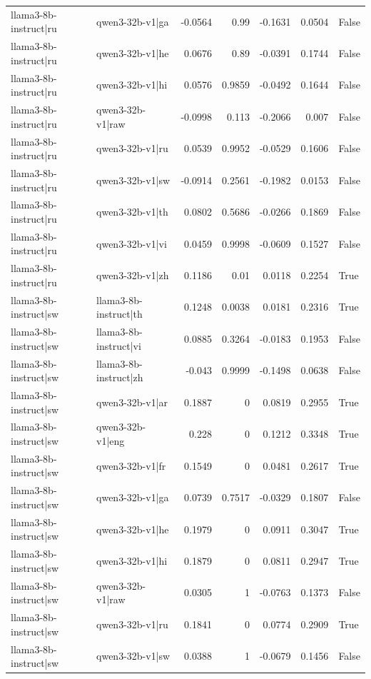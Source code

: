 \begin{table}
\begin{tabular}{l l r r r r l}
llama3-8b-instruct|ru & qwen3-32b-v1|ga & -0.0564 & 0.99 & -0.1631 & 0.0504 & False \\
llama3-8b-instruct|ru & qwen3-32b-v1|he & 0.0676 & 0.89 & -0.0391 & 0.1744 & False \\
llama3-8b-instruct|ru & qwen3-32b-v1|hi & 0.0576 & 0.9859 & -0.0492 & 0.1644 & False \\
llama3-8b-instruct|ru & qwen3-32b-v1|raw & -0.0998 & 0.113 & -0.2066 & 0.007 & False \\
llama3-8b-instruct|ru & qwen3-32b-v1|ru & 0.0539 & 0.9952 & -0.0529 & 0.1606 & False \\
llama3-8b-instruct|ru & qwen3-32b-v1|sw & -0.0914 & 0.2561 & -0.1982 & 0.0153 & False \\
llama3-8b-instruct|ru & qwen3-32b-v1|th & 0.0802 & 0.5686 & -0.0266 & 0.1869 & False \\
llama3-8b-instruct|ru & qwen3-32b-v1|vi & 0.0459 & 0.9998 & -0.0609 & 0.1527 & False \\
llama3-8b-instruct|ru & qwen3-32b-v1|zh & 0.1186 & 0.01 & 0.0118 & 0.2254 & True \\
llama3-8b-instruct|sw & llama3-8b-instruct|th & 0.1248 & 0.0038 & 0.0181 & 0.2316 & True \\
llama3-8b-instruct|sw & llama3-8b-instruct|vi & 0.0885 & 0.3264 & -0.0183 & 0.1953 & False \\
llama3-8b-instruct|sw & llama3-8b-instruct|zh & -0.043 & 0.9999 & -0.1498 & 0.0638 & False \\
llama3-8b-instruct|sw & qwen3-32b-v1|ar & 0.1887 & 0 & 0.0819 & 0.2955 & True \\
llama3-8b-instruct|sw & qwen3-32b-v1|eng & 0.228 & 0 & 0.1212 & 0.3348 & True \\
llama3-8b-instruct|sw & qwen3-32b-v1|fr & 0.1549 & 0 & 0.0481 & 0.2617 & True \\
llama3-8b-instruct|sw & qwen3-32b-v1|ga & 0.0739 & 0.7517 & -0.0329 & 0.1807 & False \\
llama3-8b-instruct|sw & qwen3-32b-v1|he & 0.1979 & 0 & 0.0911 & 0.3047 & True \\
llama3-8b-instruct|sw & qwen3-32b-v1|hi & 0.1879 & 0 & 0.0811 & 0.2947 & True \\
llama3-8b-instruct|sw & qwen3-32b-v1|raw & 0.0305 & 1 & -0.0763 & 0.1373 & False \\
llama3-8b-instruct|sw & qwen3-32b-v1|ru & 0.1841 & 0 & 0.0774 & 0.2909 & True \\
llama3-8b-instruct|sw & qwen3-32b-v1|sw & 0.0388 & 1 & -0.0679 & 0.1456 & False \\

\end{tabular}
\end{table}

